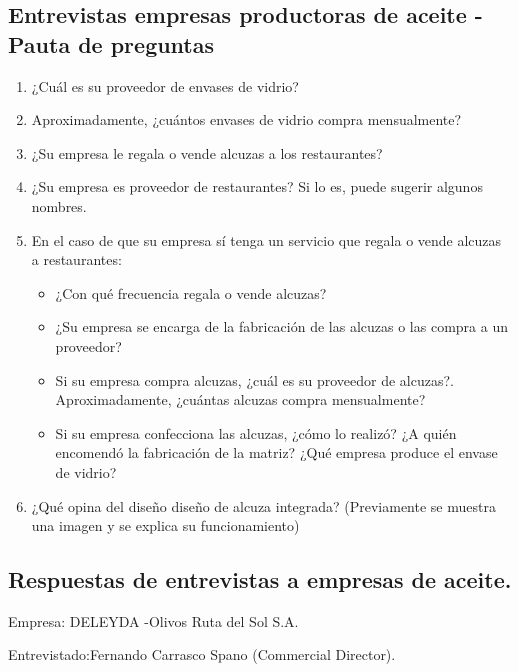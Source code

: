 \newpage
\subsection{Entrevistas empresas productoras de aceite - Pauta de preguntas}
\label{PauEntEmpAce}

\begin{enumerate}
\item ¿Cuál es su proveedor de envases de vidrio?
\item Aproximadamente, ¿cuántos envases de vidrio compra mensualmente?
\item  ¿Su empresa le regala o vende alcuzas a los restaurantes?
\item ¿Su empresa es proveedor de restaurantes? Si lo es, puede sugerir algunos nombres.
\item En el caso de que su empresa sí tenga un servicio que regala o vende alcuzas a restaurantes:
\begin{itemize}
\item ¿Con qué frecuencia regala o vende alcuzas?
\item ¿Su empresa se encarga de la fabricación de las alcuzas o las compra a un proveedor?
\item Si su empresa compra alcuzas, ¿cuál es su proveedor de alcuzas?. Aproximadamente, ¿cuántas alcuzas compra mensualmente?
\item Si su empresa confecciona las alcuzas, ¿cómo lo realizó? ¿A quién encomendó la fabricación de la matriz? ¿Qué empresa produce el envase de vidrio?
\end{itemize}
\item ¿Qué opina del diseño diseño de alcuza integrada? (Previamente se muestra una imagen y se explica su funcionamiento)
\end{enumerate}



\subsection{Respuestas de entrevistas a empresas de aceite.}
 \label{ResEntEmpAce}

Empresa: DELEYDA -Olivos Ruta del Sol S.A.

Entrevistado:Fernando Carrasco Spano (Commercial Director).

